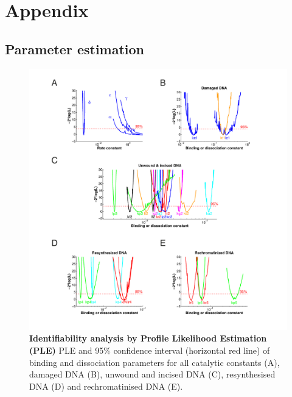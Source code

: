 \appendix
\chapter{Appendix}
\pagestyle{plain}
\setcounter{table}{0}
\renewcommand{\thetable}{A\arabic{table}}

\section{Parameter estimation}


\begin{figure}[h!]
\begin{center}
\includegraphics[width=1\textwidth]{Abbildungen/figure_A_1.pdf}
\caption{\textbf{Identifiability analysis by Profile Likelihood Estimation (PLE)} PLE and 95\% confidence interval (horizontal red line) of binding and dissociation parameters for all catalytic constants (A), damaged DNA (B), unwound and incised DNA (C), resynthesised DNA (D) and rechromatinised DNA (E). }
\label{fig:profileLikilihoods}
\end{center}
\end{figure}

